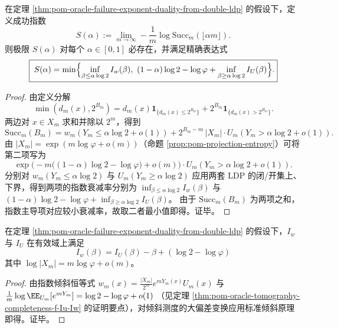 \begin{theorem}[预言机成功指数的两测度竞争公式]\label{thm:pom-oracle-success-exponent-two-measure-competition}
在定理 \ref{thm:pom-oracle-failure-exponent-duality-from-double-ldp} 的假设下，定义成功指数
\[
S(\alpha):=\lim_{m\to\infty}-\frac1m\log \mathrm{Succ}_m(\lfloor \alpha m\rfloor).
\]
则极限 \(S(\alpha)\) 对每个 \(\alpha\in[0,1]\) 必存在，并满足精确表达式
\[
\boxed{\;
S(\alpha)
=\min\Bigl\{
\inf_{\beta\le \alpha\log 2} I_w(\beta),\
(1-\alpha)\log 2-\log\varphi+\inf_{\beta\ge \alpha\log 2} I_U(\beta)
\Bigr\}.}
\]
\end{theorem}
\begin{proof}
由定义分解
\[
\min(d_m(x),2^{B_m})=d_m(x)\mathbf 1_{\{d_m(x)\le 2^{B_m}\}}+2^{B_m}\mathbf 1_{\{d_m(x)>2^{B_m}\}}.
\]
两边对 \(x\in X_m\) 求和并除以 \(2^m\)，得到
\[
\mathrm{Succ}_m(B_m)
=w_m(Y_m\le \alpha\log 2+o(1))
+2^{B_m-m}\,|X_m|\cdot U_m(Y_m>\alpha\log 2+o(1)).
\]
由 \(|X_m|=\exp(m\log\varphi+o(m))\)（命题 \ref{prop:pom-projection-entropy}）可将第二项写为
\[
\exp\!\bigl(-m\bigl((1-\alpha)\log 2-\log\varphi\bigr)+o(m)\bigr)\cdot U_m(Y_m>\alpha\log 2+o(1)).
\]
分别对 \(w_m(Y_m\le \alpha\log 2)\) 与 \(U_m(Y_m\ge \alpha\log 2)\) 应用两套 LDP 的闭/开集上、下界，得到两项的指数衰减率分别为
\(
\inf_{\beta\le \alpha\log 2}I_w(\beta)
\)
与
\(
(1-\alpha)\log 2-\log\varphi+\inf_{\beta\ge \alpha\log 2}I_U(\beta)
\)。
由于 \(\mathrm{Succ}_m(B_m)\) 为两项之和，指数主导项对应较小衰减率，故取二者最小值即得。证毕。
\end{proof}

\begin{corollary}[指数倾斜与速率函数的仿射关系]\label{cor:pom-oracle-Iw-Iu-affine-tilt}
在定理 \ref{thm:pom-oracle-failure-exponent-duality-from-double-ldp} 的假设下，\(I_w\) 与 \(I_U\) 在有效域上满足
\[
\boxed{\;
I_w(\beta)=I_U(\beta)-\beta+(\log 2-\log\varphi)\;}
\]
其中 \(\log|X_m|=m\log\varphi+o(m)\)。
\end{corollary}
\begin{proof}
由指数倾斜恒等式 \(w_m(x)=\frac{|X_m|}{2^m}e^{mY_m(x)}U_m(x)\) 与
\(
\frac1m\log\EE_{U_m}[e^{mY_m}]=\log 2-\log\varphi+o(1)
\)
（见定理 \ref{thm:pom-oracle-tomography-completeness-f-Iu-Iw} 的证明要点），对倾斜测度的大偏差变换应用标准倾斜原理即得。证毕。
\end{proof}

